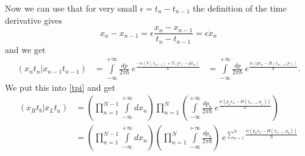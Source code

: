 Now we can use that for very small $\epsilon = t_n - t_{n-1}$ the definition of the time derivative gives
\begin{equation}\label{deriv}
  x_{n} - x_{n-1} = \epsilon \frac{x_{n} -x_{n-1}}{t_n - t_{n-1}} =  \epsilon \dot{x}_n
\end{equation}
and we get
\begin{align}
   (x_n t_n | x_{n-1} t_{n-1})  &=  \int\limits_{-\infty}^{+\infty} \frac{dp}{2 \pi \hbar}  \ e^{\frac{-i \epsilon ( V(x_{n-1}) + T(p) - p \dot{x}_n)}{\hbar}}
                                &=  \int\limits_{-\infty}^{+\infty} \frac{dp}{2 \pi \hbar}  \ e^{\frac{i \epsilon (p \dot{x}_n - H(x_{n-1},p))}{\hbar}}.
\end{align}
We put this into \ref{tpi} and get 
\begin{align}
  (x_R t_b | x_L t_a) &=  (\prod_{n=1}^{N-1} \int\limits_{-\infty}^{+\infty} dx_{n})\prod_{n=1}^{N} (\int\limits_{-\infty}^{+\infty} \frac{dp_n}{2 \pi \hbar}  \ e^{\frac{i \epsilon (p_n \dot{x}_n - H(x_{n-1},p_n))}{\hbar}})  \\
                      &=  (\prod_{n=1}^{N-1} \int\limits_{-\infty}^{+\infty} dx_{n})(\prod_{n=1}^{N} \int\limits_{-\infty}^{+\infty}  \frac{dp_n}{2 \pi \hbar}) \ e^{\sum_{n=1}^{N}\frac{i \epsilon (p_n \dot{x}_n - H(x_{n-1},p_n))}{\hbar}}
\end{align}
